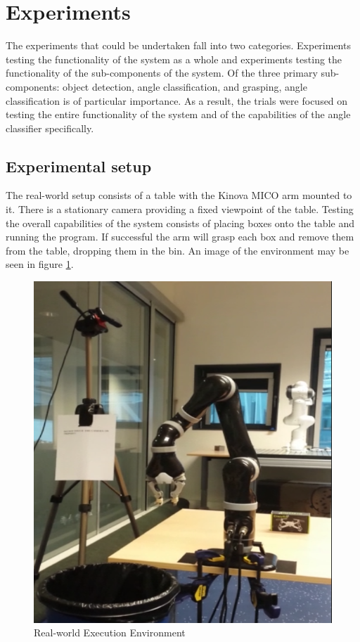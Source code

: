 \documentclass[letterpaper, 10 pt, conference]{conf/ieeeconf}  %
\begin{document}
\section{Experiments}
The experiments that could be undertaken fall into two categories. Experiments
testing the functionality of the system as a whole and experiments testing the
functionality of the sub-components of the system. Of the three primary
sub-components: object detection, angle classification, and grasping, angle
classification is of particular importance. As a result, the trials were focused
on testing the entire functionality of the system and of the capabilities of the
angle classifier specifically.

\subsection{Experimental setup}
The real-world setup consists of a table with the Kinova MICO arm mounted to it.
There is a stationary camera providing a fixed viewpoint of the table. Testing
the overall capabilities of the system consists of placing boxes onto the table
and running the program. If successful the arm will grasp each box and remove
them from the table, dropping them in the bin. An image of the environment may
be seen in figure \ref{fig:real_environment}.

\begin{figure}[ht]
  \centering
  \includegraphics[width=0.8\linewidth]{real_environment.png}
  \caption{\label{fig:real_environment} Real-world Execution Environment}
\end{figure}
\end{document}
